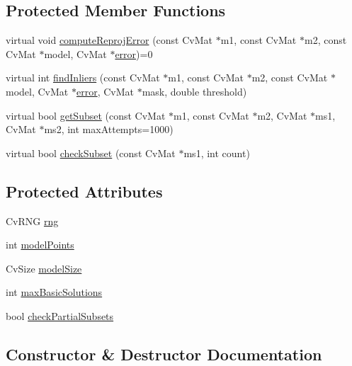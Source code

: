 \subsection*{Protected Member Functions}
\begin{DoxyCompactItemize}
\item 
virtual void \hyperlink{class_cv_model_estimator2_ae2aa4bbc11e6fc303d81b95daf2795ad}{compute\+Reproj\+Error} (const Cv\+Mat $\ast$m1, const Cv\+Mat $\ast$m2, const Cv\+Mat $\ast$model, Cv\+Mat $\ast$\hyperlink{_import_log_8m_af10dacfa214e2575bb2e0ee407c242e0}{error})=0
\item 
virtual int \hyperlink{class_cv_model_estimator2_a7683a8352f66ba994982493690f418b1}{find\+Inliers} (const Cv\+Mat $\ast$m1, const Cv\+Mat $\ast$m2, const Cv\+Mat $\ast$model, Cv\+Mat $\ast$\hyperlink{_import_log_8m_af10dacfa214e2575bb2e0ee407c242e0}{error}, Cv\+Mat $\ast$mask, double threshold)
\item 
virtual bool \hyperlink{class_cv_model_estimator2_a8a1749e60a02a5cb697425bd2daa35af}{get\+Subset} (const Cv\+Mat $\ast$m1, const Cv\+Mat $\ast$m2, Cv\+Mat $\ast$ms1, Cv\+Mat $\ast$ms2, int max\+Attempts=1000)
\item 
virtual bool \hyperlink{class_cv_model_estimator2_ae149bd480d9b445c66b1c34a351cbb5a}{check\+Subset} (const Cv\+Mat $\ast$ms1, int count)
\end{DoxyCompactItemize}
\subsection*{Protected Attributes}
\begin{DoxyCompactItemize}
\item 
Cv\+R\+NG \hyperlink{class_cv_model_estimator2_a5199037f573a5af1bd9f419e5a64e3e4}{rng}
\item 
int \hyperlink{class_cv_model_estimator2_a7c4067aa8938e61ca4b2674a58ccfe35}{model\+Points}
\item 
Cv\+Size \hyperlink{class_cv_model_estimator2_a93286a6b978450e6363b2403b5da1ff5}{model\+Size}
\item 
int \hyperlink{class_cv_model_estimator2_ac954ec76553da0908f863c48aa82d1ef}{max\+Basic\+Solutions}
\item 
bool \hyperlink{class_cv_model_estimator2_a579cf07784af6c3710ab23aa841cb7d5}{check\+Partial\+Subsets}
\end{DoxyCompactItemize}


\subsection{Constructor \& Destructor Documentation}
\mbox{\label{class_cv_model_estimator2_a91cf072d79537808e705a9fa31867da3}} 
